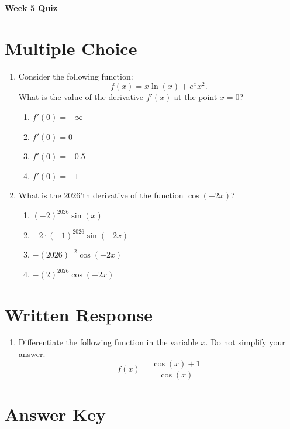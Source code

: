 \documentclass[11pt, reqno]{article}
\theoremstyle{plain}
\theoremstyle{definition}
\theoremstyle{remark}
\begin{document}
\topmargin=-40pt
\renewcommand{\headrulewidth}{1pt}
\renewcommand{\headsep}{20pt}
\thispagestyle{fancy}

{\Huge \bfseries \noindent Week 5 Quiz}

\section*{Multiple Choice}

\begin{enumerate}
    \item[1.] [5 points] Consider the following function:
    \[
        f(x) = x\ln(x) + e^x x^2.
    \]
    What is the value of the derivative $f'(x)$ at the point $x = 0$?
    \begin{enumerate}
        \item $f'(0) = -\infty$
        \item $f'(0) = 0$
        \item $f'(0) = -0.5$
        \item $f'(0) = -1$
    \end{enumerate}

    \item[2.] [5 points] What is the $2026$'th derivative of the function $\cos(-2x)$?
    \begin{enumerate}
        \item ${(-2)}^{2026}\sin(x)$
        \item $-2\cdot{(-1)}^{2026}\sin(-2x)$
        \item $-{(2026)}^{-2}\cos(-2x)$
        \item $-{(2)}^{2026}\cos(-2x)$
    \end{enumerate}
\end{enumerate}

\section*{Written Response}

\begin{enumerate}
    \item[3.] [10 points] Differentiate the following function in the variable $x$. Do not simplify your answer.
    \[
        f(x) = \frac{\cos(x) + 1}{\cos(x)}
    \]
\end{enumerate}

\newpage

\section*{Answer Key}
\end{document}
